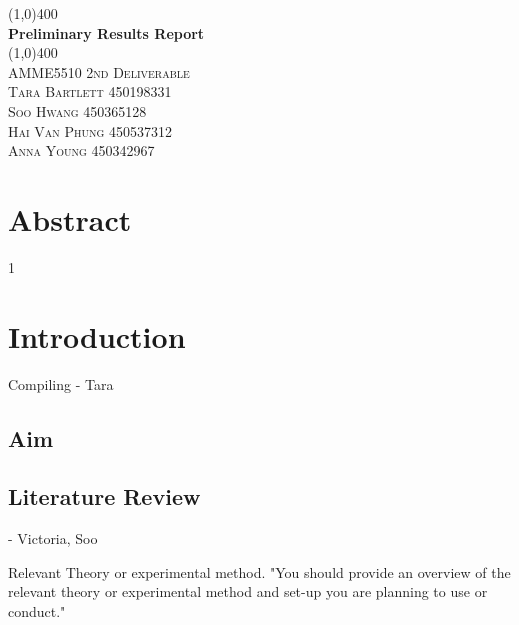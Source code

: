 \documentclass{article}
\begin{document}
\begin{titlepage}
	
\end{titlepage}
\cleardoublepage	
\begin{titlepage}
	\begin{center}
		
		\vspace{2cm}
		\line(1,0){400}\\
		[1cm]
		\huge{\bfseries Preliminary Results Report}\\
		[2mm]
		\line(1,0){400}\\
		[1.5cm]
		\textsc{\LARGE AMME5510 2nd Deliverable}\\
	\vspace{11.75cm}
		\textsc{\large Tara Bartlett 450198331}\\
		\textsc{\large Soo Hwang 450365128}\\
		\textsc{\large  Hai Van Phung 450537312}\\
		\textsc{\large Anna Young 450342967}
		
	\end{center}
\end{titlepage}


\section{Abstract}

\tableofcontents
\cleardoublepage


\setcounter{page}1

\newpage

\section{Introduction}
Compiling - Tara
\subsection{Aim}

\newpage
\subsection{Literature Review} - Victoria, Soo

Relevant Theory or experimental method. "You should provide an overview of the relevant theory or experimental method and set-up you are planning to use or conduct."
\end{document}
